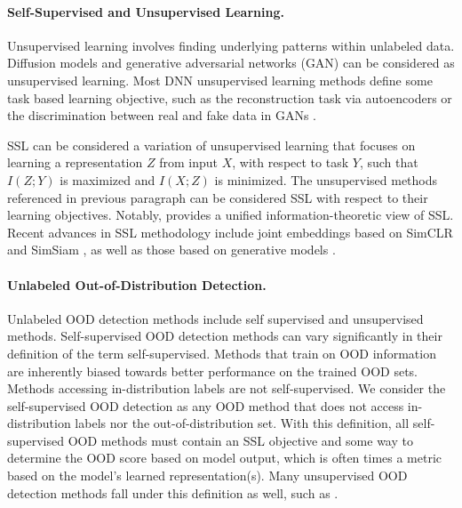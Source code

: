 \documentclass{article} %
\theoremstyle{plain}
\theoremstyle{definition}
\theoremstyle{remark}
\begin{document}
\paragraph{Self-Supervised and Unsupervised Learning.}

Unsupervised learning involves finding underlying patterns within unlabeled data. Diffusion models \citep{ho2020denoising} and generative adversarial networks (GAN) \citep{karras2017progressive} can be considered as unsupervised learning. Most DNN unsupervised learning methods define some task based learning objective, such as the reconstruction task via autoencoders \citep{baldi2012autoencoders} or the discrimination between real and fake data in GANs \citep{creswell2018generative}. 

SSL can be considered a variation of unsupervised learning that focuses on learning a representation $Z$ from input $X$, with respect to task $Y$, such that $I(Z;Y)$ is maximized and $I(X;Z)$ is minimized. The unsupervised methods referenced in previous paragraph can be considered SSL with respect to their learning objectives. Notably, \citep{shwartz2023compress} provides a unified information-theoretic view of SSL. Recent advances in SSL methodology include joint embeddings based on SimCLR \citep{chen2020simple} and SimSiam \citep{chen2021exploring}, as well as those based on generative models \citep{he2022masked}. 

\vspace{-2mm}\paragraph{Unlabeled Out-of-Distribution Detection.}

Unlabeled OOD detection methods include self supervised and unsupervised methods. Self-supervised OOD detection methods can vary significantly in their definition of the term self-supervised. Methods that train on OOD information \citep{mohseni2020self} are inherently biased towards better performance on the trained OOD sets. Methods accessing in-distribution labels \citep{vyas2018out} are not self-supervised. We consider the self-supervised OOD detection as any OOD method that does not access in-distribution labels nor the out-of-distribution set. With this definition, all self-supervised OOD methods must contain an SSL objective and some way to determine the OOD score based on  model output, which is often times a metric based on the model's learned representation(s). Many unsupervised OOD detection methods fall under this definition as well, such as \citep{daxberger2019bayesian, liu2023unsupervised, xiao2020likelihood}.
\end{document}
